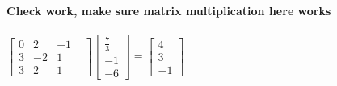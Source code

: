 \documentclass{article}
\begin{document}
\textbf{Check work, make sure matrix multiplication here works}\\\\
$\begin{bmatrix}
0 & 2 & -1  \\
3 & -2 & 1   \\
3 & 2 & 1 &  
\end{bmatrix}
\begin{bmatrix}
\frac{7}{3}  \\
-1  \\
-6 
\end{bmatrix}=
\begin{bmatrix}
4  \\
3  \\
-1 
\end{bmatrix}
$\\\\
\end{document}
